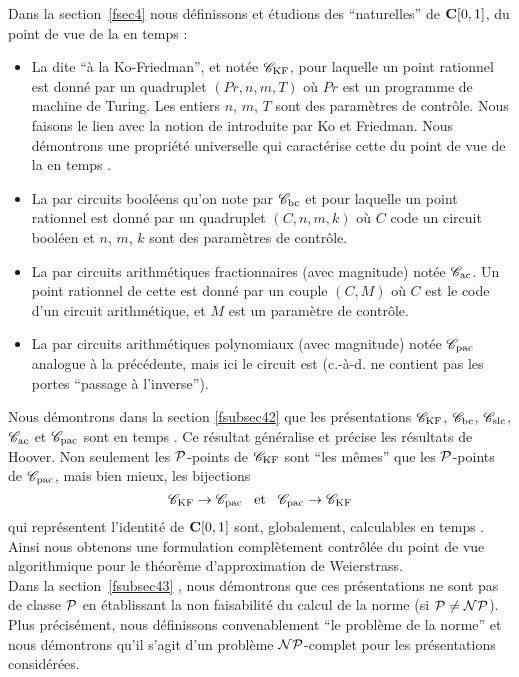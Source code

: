 \medskip Dans la section~\ref{fsec4} nous définissons et étudions des \rps  
``naturelles'' de  ${{\bf C}[0,1]}$,  \equivas du point de vue de la \com en temps 
\poll:
\begin{itemize}
\item La \pres dite ``à la Ko-Friedman'', et notée ${{{\mathscr C}}_{\rm KF}}$, pour laquelle un point rationnel est donné par un quadruplet $(Pr, n, m, T)$ 
où  $Pr$  est un programme de machine de Turing. Les entiers $n$, $m$,  $T$  sont des paramètres de contrôle.  
Nous faisons le lien avec la notion de \com introduite par Ko et Friedman. Nous démontrons une propriété universelle 
qui caractérise cette \rp  du point de vue de la \com en temps \poll.
\item La \pres par circuits booléens qu'on note par ${{{\mathscr C}}_{\rm bc}}$ et pour laquelle un point rationnel est donné par un quadruplet  $(C,n,m,k)$  où  $C$  code un circuit booléen et  $n$,  $m$,  $k$  sont des paramètres de contrôle.
\item La \pres par circuits arithmétiques fractionnaires (avec magnitude) 
notée  ${{{\mathscr C}}_{\rm ac}}$. 
Un point rationnel de cette \pres est donné par un couple $(C,M)$ où $C$  est le code d'un circuit arithmétique, et $M$ est un paramètre de contrôle.
\item La \pres par circuits arithmétiques polynomiaux (avec magnitude) notée  ${{{\mathscr C}}_{\rm pac}}$ analogue à la précédente, mais ici le circuit est \poll 
(c.-à-d. ne contient pas les portes ``passage à l'inverse''). 
\end{itemize}
Nous démontrons dans la section \ref{fsubsec42} que les présentations  ${{{\mathscr C}}_{\rm KF}}$,  
${{{\mathscr C}}_{\rm bc}}$,  ${{{\mathscr C}}_{\rm slc}}$,  ${{{\mathscr C}}_{\rm ac}}$  et  ${{{\mathscr C}}_{\rm pac}}$  sont \equivas en temps \poll. Ce 
résultat généralise et précise les résultats de Hoover. Non seulement 
les ${\cal P}$-points de  ${{{\mathscr C}}_{\rm KF}}$  sont ``les mêmes'' que les ${\cal P}$-points de  ${{{\mathscr C}}_{\rm pac}}$, 
mais bien mieux, les bijections  
$$ {{{\mathscr C}}_{\rm KF}} \rightarrow {{{\mathscr C}}_{\rm pac}} \;\; \;  \hbox{et} \; \; \; {{{\mathscr C}}_{\rm pac}} \rightarrow {{{\mathscr C}}_{\rm KF}} $$
qui représentent l'identité de  ${{\bf C}[0,1]}$  sont, globalement, calculables en 
temps \poll. 
Ainsi nous obtenons une formulation complètement contrôlée du point de vue 
algorithmique pour le théorème d'approximation de Weierstrass. \\

\smallskip Dans la section~\ref{fsubsec43} , nous démontrons que ces 
présentations ne sont pas de classe  ${\cal P}$  en établissant la non 
faisabilité du calcul de la norme (si  ${\cal P}\neq {\cal NP}$). Plus précisément, 
nous définissons convenablement ``le problème de la norme'' et nous 
démontrons qu'il s'agit d'un problème ${\cal NP}$-complet pour les présentations 
considérées. 

